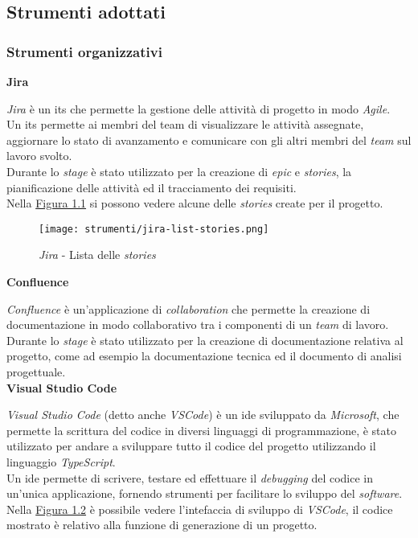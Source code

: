\pagebreak
\subsection{Strumenti adottati}
\label{sez:strumenti-adottati}

\subsubsection{Strumenti organizzativi}
\label{sez:strumenti-organizzativi}

\noindent \textbf{Jira\\}

\noindent \textit{Jira} è un \gls{its} che permette la gestione delle attività di progetto in modo \textit{Agile}.\\
Un \gls{its} permette ai membri del team di visualizzare le attività assegnate, aggiornare lo stato di avanzamento e comunicare con gli altri membri del \textit{team} sul lavoro svolto. \\
Durante lo \textit{stage} è stato utilizzato per la creazione di \textit{epic} e \textit{stories}, la pianificazione delle attività ed il tracciamento dei requisiti. \\
Nella {\hyperref[fig:jira-list-stories]{Figura 1.1}} si possono vedere alcune delle \textit{stories} create per il progetto.
\begin{figure}[H]
    \label{fig:jira-list-stories}
    \centering
    \texttt{[image: strumenti/jira-list-stories.png]}
    \caption{\textit{Jira} - Lista delle \textit{stories}}
\end{figure}


\noindent \textbf{Confluence\\}

\noindent \textit{Confluence} è un'applicazione di \textit{collaboration} che permette la creazione di documentazione in modo collaborativo tra i componenti di un \textit{team} di lavoro.\\
Durante lo \textit{stage} è stato utilizzato per la creazione di documentazione relativa al progetto, come ad esempio la documentazione tecnica ed il documento di analisi progettuale.\\


\noindent \textbf{Visual Studio Code\\}

\noindent \textit{Visual Studio Code} (detto anche \textit{VSCode}) è un \gls{ide} sviluppato da \textit{Microsoft}, che permette la scrittura del codice in diversi linguaggi di programmazione, è stato utilizzato per andare
a sviluppare tutto il codice del progetto utilizzando il linguaggio \textit{TypeScript}.\\
Un \gls{ide} permette di scrivere, testare ed effettuare il \textit{debugging} del codice in un'unica applicazione, fornendo strumenti per facilitare lo sviluppo del \textit{software}.\\
Nella {\hyperref[fig:vscode]{Figura 1.2}} è possibile vedere l'intefaccia di sviluppo di \textit{VSCode}, il codice mostrato è relativo alla funzione di generazione di un progetto.

